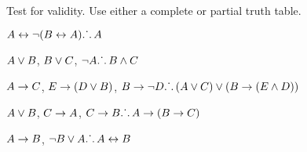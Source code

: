 \documentclass[PHIL101-Textbook.tex]{subfiles}
\begin{document}
\noindent\problempart Test for validity. Use either a complete or partial truth table.
\label{pr.TT.valid6} 
\begin{earg}
\item $A\leftrightarrow\neg(B\leftrightarrow A)\ldotp\dot{}\,\ldotp A$ %
\item $A\vee B$, $B\vee C$, $\neg A\ldotp\dot{}\,\ldotp B \land C$ %
\item $A \rightarrow C$, $E \rightarrow (D \vee B)$, $B \rightarrow \neg D\ldotp\dot{}\,\ldotp (A \vee C) \vee (B \rightarrow (E \land D))$ %
\item $A \vee B$, $C \rightarrow A$, $C \rightarrow B\ldotp\dot{}\,\ldotp A \rightarrow (B \rightarrow C)$ %
\item $A \rightarrow B$, $\neg B \vee A\ldotp\dot{}\,\ldotp A \leftrightarrow B$ %
\end{earg}
\end{document}
